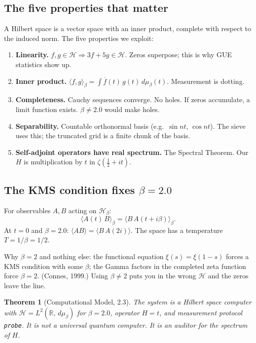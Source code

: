 \documentclass[11pt,letterpaper]{article}
\newtheorem{theorem}{Theorem}
\begin{document}
\subsection{The five properties that matter}

A Hilbert space is a vector space with an inner product, complete with
respect to the induced norm. The five properties we exploit:

\begin{enumerate}
  \item \textbf{Linearity.} $f, g \in \mathcal{H} \Rightarrow 3f + 5g \in \mathcal{H}$. Zeros superpose; this is why GUE statistics show up.
  \item \textbf{Inner product.} $\langle f, g \rangle_\beta = \int \overline{f}(t)\, g(t)\, d\mu_\beta(t)$. Measurement is dotting.
  \item \textbf{Completeness.} Cauchy sequences converge. No holes. If zeros accumulate, a limit function exists. $\beta \neq 2.0$ would make holes.
  \item \textbf{Separability.} Countable orthonormal basis (e.g.\ $\sin nt$, $\cos nt$). The sieve uses this; the truncated grid is a finite chunk of the basis.
  \item \textbf{Self-adjoint operators have real spectrum.} The Spectral Theorem. Our $H$ is multiplication by $t$ in $\zeta(\tfrac{1}{2} + it)$.
\end{enumerate}

\subsection{The KMS condition fixes $\beta = 2.0$}

For observables $A, B$ acting on $\mathcal{H}_\beta$:
\[
  \langle A(t)\, B \rangle_\beta = \langle B \, A(t + i\beta) \rangle_\beta.
\]
At $t = 0$ and $\beta = 2.0$: $\langle AB \rangle = \langle B\, A(2i) \rangle$.
The space has a temperature $T = 1/\beta = 1/2$.

Why $\beta = 2$ and nothing else: the functional equation $\xi(s) = \xi(1-s)$
forces a KMS condition with some $\beta$; the Gamma factors in the completed
zeta function force $\beta = 2$. (Connes, 1999.) Using $\beta \neq 2$ puts
you in the wrong $\mathcal{H}$ and the zeros leave the line.

\begin{theorem}[Computational Model, 2.3]
The system is a Hilbert space computer with $\mathcal{H} = L^2(\mathbb{R},\, d\mu_\beta)$
for $\beta = 2.0$, operator $H = t$, and measurement protocol \texttt{probe}.
It is \emph{not} a universal quantum computer. It is an auditor for the
spectrum of $H$.
\end{theorem}
\end{document}
